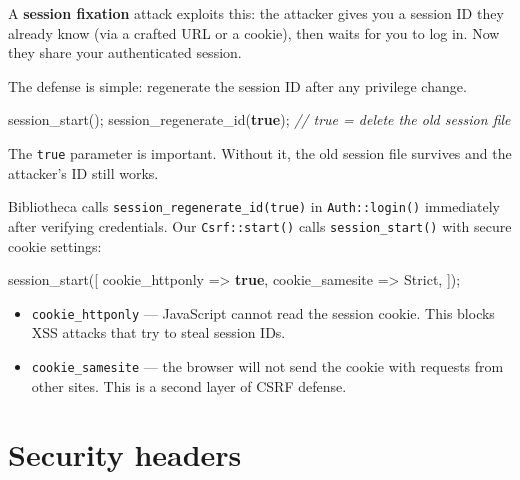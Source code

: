 \documentclass[11pt,a4paper,oneside]{book}
\newenvironment{Shaded}{\begin{snugshade}}{\end{snugshade}}
\newcommand{\KeywordTok}[1]{\textcolor[HTML]{007020}{\textbf{#1}}}
\newcommand{\StringTok}[1]{\textcolor[HTML]{4070A0}{#1}}
\newcommand{\CommentTok}[1]{\textcolor[HTML]{60A0B0}{\textit{#1}}}
\newcommand{\OtherTok}[1]{\textcolor[HTML]{007020}{#1}}
\newcommand{\FunctionTok}[1]{\textcolor[HTML]{06287E}{#1}}
\newcommand{\NormalTok}[1]{#1}
\providecommand{\tightlist}{%
  \setlength{\itemsep}{0pt}\setlength{\parskip}{0pt}}
\begin{document}
A \textbf{session fixation} attack exploits this: the attacker
gives you a session ID they already know (via a crafted URL or a
cookie), then waits for you to log in. Now they share your
authenticated session.

The defense is simple: regenerate the session ID after any
privilege change.

\begin{Shaded}
\begin{Highlighting}[]
\FunctionTok{session\_start}\NormalTok{()}\OtherTok{;}
\FunctionTok{session\_regenerate\_id}\NormalTok{(}\KeywordTok{true}\NormalTok{)}\OtherTok{;}  \CommentTok{// true = delete the old session file}
\end{Highlighting}
\end{Shaded}

The \texttt{true} parameter is important. Without it, the old
session file survives and the attacker's ID still works.

Bibliotheca calls \texttt{session\_regenerate\_id(true)} in
\texttt{Auth::login()} immediately after verifying credentials.
Our \texttt{Csrf::start()} calls \texttt{session\_start()} with
secure cookie settings:

\begin{Shaded}
\begin{Highlighting}[]
\FunctionTok{session\_start}\NormalTok{([}
    \StringTok{\textquotesingle{}cookie\_httponly\textquotesingle{}}\NormalTok{ =\textgreater{} }\KeywordTok{true}\OtherTok{,}
    \StringTok{\textquotesingle{}cookie\_samesite\textquotesingle{}}\NormalTok{ =\textgreater{} }\StringTok{\textquotesingle{}Strict\textquotesingle{}}\OtherTok{,}
\NormalTok{])}\OtherTok{;}
\end{Highlighting}
\end{Shaded}

\begin{itemize}
\tightlist
\item
  \texttt{cookie\_httponly} --- JavaScript cannot read the
  session cookie. This blocks XSS attacks that try to steal
  session IDs.
\item
  \texttt{cookie\_samesite} --- the browser will not send the
  cookie with requests from other sites. This is a second layer
  of CSRF defense.
\end{itemize}

\hypertarget{security-headers}{%
\section{Security headers}\label{security-headers}}
\end{document}
